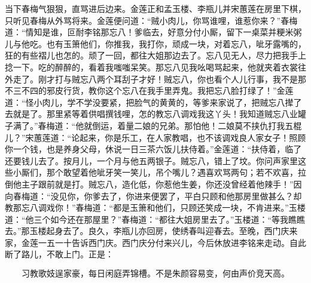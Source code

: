 当下春梅气狠狠，直骂进后边来。金莲正和孟玉楼、李瓶儿并宋蕙莲在房里下棋，只听见春梅从外骂将来。金莲便问道：“贼小肉儿，你骂谁哩，谁惹你来？”春梅道：“情知是谁，叵耐李铭那忘八！爹临去，好意分付小厮，留下一桌菜并粳米粥儿与他吃。也有玉箫他们，你推我，我打你，顽成一块，对着忘八，呲牙露嘴的，狂的有些褶儿也怎的。顽了一回，都往大姐那边去了。忘八见无人，尽力把我手上捻一下。吃的醉醉的，看着我嗤嗤呆笑。那忘八见我吆喝骂起来，他就夹着衣裳往外走了。刚才打与贼忘八两个耳刮子才好！贼忘八，你也看个人儿行事，我不是那不三不四的邪皮行货，教你这个忘八在我手里弄鬼。我把忘八脸打绿了！”金莲道：“怪小肉儿，学不学没要紧，把脸气的黄黄的，等爹来家说了，把贼忘八撵了去就是了。那里紧等着供唱撰钱哩，怎的教忘八调戏我这丫头！我知道贼忘八业罐子满了。”春梅道：“他就倒运，着量二娘的兄弟。那怕他！二娘莫不挟仇打我五棍儿？”宋蕙莲道：“论起来，你是乐工，在人家教唱，也不该调戏良人家女子！照顾你一个钱，也是养身父母，休说一日三茶六饭儿扶侍着。”金莲道：“扶侍着，临了还要钱儿去了。按月儿，一个月与他五两银子。贼忘八，错上了坟。你问声家里这些小厮们，那个敢望着他呲牙笑一笑儿，吊个嘴儿？遇喜欢骂两句；若不欢喜，拉倒他主子跟前就是打。贼忘八，造化低，你惹他生姜，你还没曾经着他辣手！”因向春梅道：“没见你，你爹去了，你进来便罢了，平白只顾和他那房里做甚么？却教那忘八调戏你！”春梅道：“都是玉箫和他们，只顾还笑成一块，不肯进来。”玉楼道：“他三个如今还在那屋里？”春梅道：“都往大姐房里去了。”玉楼道：“等我瞧瞧去。”那玉楼起身去了。良久，李瓶儿亦回房，使绣春叫迎春去。至晚，西门庆来家，金莲一五一十告诉西门庆。西门庆分付来兴儿，今后休放进李铭来走动。自此断了路儿，不敢上门。正是：

\[
习教歌妓逞家豪，每日闲庭弄锦槽。
不是朱颜容易变，何由声价竞天高。
\]

